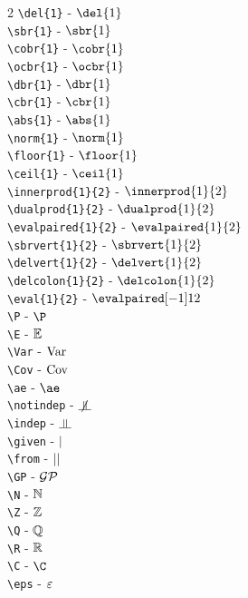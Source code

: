 \documentclass[11pt]{book}
\begin{document}
\begin{multicols}{2}
\texttt{\textbackslash del\{1\}} - $\del{1}$\\
\texttt{\textbackslash sbr\{1\}} - $\sbr{1}$\\
\texttt{\textbackslash cobr\{1\}} - $\cobr{1}$\\
\texttt{\textbackslash ocbr\{1\}} - $\ocbr{1}$\\
\texttt{\textbackslash dbr\{1\}} - $\dbr{1}$\\
\texttt{\textbackslash cbr\{1\}} - $\cbr{1}$\\
\texttt{\textbackslash abs\{1\}} - $\abs{1}$\\
\texttt{\textbackslash norm\{1\}} - $\norm{1}$\\
\texttt{\textbackslash floor\{1\}} - $\floor{1}$\\
\texttt{\textbackslash ceil\{1\}} - $\ceil{1}$\\
\texttt{\textbackslash innerprod\{1\}\{2\}} - $\innerprod{1}{2}$\\
\texttt{\textbackslash dualprod\{1\}\{2\}} - $\dualprod{1}{2}$\\
\texttt{\textbackslash evalpaired\{1\}\{2\}} - $\evalpaired{1}{2}$\\
\texttt{\textbackslash sbrvert\{1\}\{2\}} - $\sbrvert{1}{2}$\\
\texttt{\textbackslash delvert\{1\}\{2\}} - $\delvert{1}{2}$\\
\texttt{\textbackslash delcolon\{1\}\{2\}} - $\delcolon{1}{2}$\\
\texttt{\textbackslash eval\{1\}\{2\}} - $\eval{1}{2}$\\

\texttt{\textbackslash P} - $\P$\\
\texttt{\textbackslash E} - $\operatorname{\mathbb{E}}$\\
\texttt{\textbackslash Var} - $\operatorname{Var}$\\
\texttt{\textbackslash Cov} - $\operatorname{Cov}$\\
\texttt{\textbackslash ae} - $\ae$\\
\texttt{\textbackslash notindep} - $\notindep$\\
\texttt{\textbackslash indep} - $\indep$\\
\texttt{\textbackslash given} - $\mid$\\
\texttt{\textbackslash from} - $\mid\mid$\\

\texttt{\textbackslash GP} - $\mathcal{GP}$\\

\texttt{\textbackslash N} - $\mathbb{N}$\\
\texttt{\textbackslash Z} - $\mathbb{Z}$\\
\texttt{\textbackslash Q} - $\mathbb{Q}$\\
\texttt{\textbackslash R} - $\mathbb{R}$\\
\texttt{\textbackslash C} - $\C$\\
\texttt{\textbackslash eps} - $\varepsilon$\\


\end{multicols}
\end{document}
